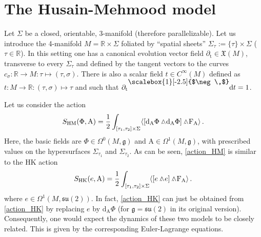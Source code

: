 \documentclass[12pt]{amsart}
\theoremstyle{plain}
\theoremstyle{definition}
\theoremstyle{remark}
\newcommand{\iprod}{\raisebox{8pt}{\scalebox{1}[-2.5]{$\neg\,$}}}
\newcommand{\wed}{\wedge\hspace*{-7.5pt}.\hspace*{3pt}}
\numberwithin{equation}{section}  %
\begin{document}
%
%
\section{The Husain-Mehmood model}{\label{sec_HM_model}}

Let $\Sigma$ be a closed, orientable, 3-manifold (therefore parallelizable). Let us introduce the 4-manifold $M=\mathbb{R}\times\Sigma$ foliated by ``spatial sheets'' $\Sigma_\tau:=\{\tau\}\times\Sigma$ ($\tau\in\mathbb{R}$). In this setting one has a canonical evolution vector field $\partial_{\mathrm{t}}\in \mathfrak{X}(M )$, transverse to every $\Sigma_\tau$ and defined by the tangent vectors to the curves $c_\sigma:\mathbb{R}\rightarrow M:\tau\mapsto (\tau,\sigma)$. There is also a scalar field $t\in C^\infty(M )$ defined as $t:M \rightarrow \mathbb{R}:(\tau,\sigma)\mapsto \tau$ and such that ${\partial_{\mathrm{t}}}\iprod \mathrm{d} t=1$.

Let us consider the action
\begin{equation}\label{action_HM}
S_{\mathrm{HM}}(\Phi,\mathrm{A})=\frac{1}{2}\int_{[\tau_1,\tau_2]\times \Sigma}\langle[\mathrm{d}_{\mathrm{A}}\Phi\wed \mathrm{d}_{\mathrm{A}}\Phi]\wed \mathrm{F}_{\mathrm{A}}\rangle\,.
\end{equation}
Here, the basic fields are  $\Phi\in\Omega^0(M ,\mathfrak{g})$ and $\mathrm{A}\in\Omega^1(M ,\mathfrak{g})$,  with prescribed values on the hypersurfaces \(\Sigma_{\tau_1}\) and \(\Sigma_{\tau_2}\).  
As can be seen, \eqref{action_HM} is similar to the HK action \cite{HK}
\begin{equation}\label{action_HK}
S_{\mathrm{HK}}(e,\mathrm{A})=\frac{1}{2}\int_{[\tau_1,\tau_2]\times \Sigma}\langle[e\wed e]\wed \mathrm{F}_\mathrm{A}\rangle\,.
\end{equation}
where $e\in\Omega^1(M,\mathfrak{su}(2))$. In fact, \eqref{action_HK} can just be obtained from \eqref{action_HK} by replacing $e$ by $\mathrm{d}_\mathrm{A}\Phi$ (for $\mathfrak{g}=\mathfrak{su(2)}$ in its original version). Consequently, one would expect the dynamics of these two models to be closely related. This is given by the corresponding Euler-Lagrange equations.
\end{document}
